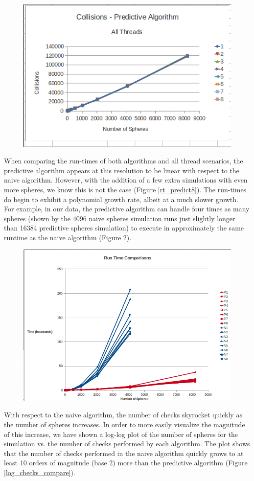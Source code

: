 \documentclass[CEJCS,PDF]{cej} %
\begin{document}
\begin{center}
\begin{figure}
	\includegraphics[width=.45\textwidth]{collisions_predictive_allthreads.png}
	\label{col_predict8}
\end{figure}
\end{center}

When comparing the run-times of both algorithms and all thread scenarios, the predictive algorithm appears at this resolution to be linear with respect to the naive algorithm.  However, with the addition of a few extra simulations with even more spheres, we know this is not the case (Figure \ref{rt_predict8}).  The run-times do begin to exhibit a polynomial growth rate, albeit at a much slower growth.  For example, in our data, the predictive algorithm can handle four times as many spheres (shown by the 4096 naive spheres simulation runs just slightly longer than 16384 predictive spheres simulation) to execute in approximately the same runtime as the naive algorithm (Figure \ref{rt_compare}).

\begin{center}
\begin{figure}
	\includegraphics[width=.45\textwidth]{runtime_comparison.png}
	\label{rt_compare}
\end{figure}
\end{center}

With respect to the naive algorithm, the number of checks skyrocket quickly as the number of spheres increases.  In order to more easily visualize the magnitude of this increase, we have shown a log-log plot of the number of spheres for the simulation vs. the number of checks performed by each algorithm.  The plot shows that the number of checks performed in the naive algorithm quickly grows to at least 10 orders of magnitude (base 2) more than the predictive algorithm (Figure \ref{log_checks_compare}).
\end{document}
